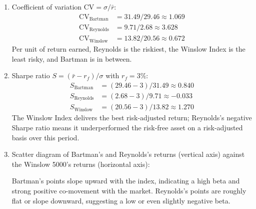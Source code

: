 \documentclass[11pt]{article}
\begin{document}
\begin{enumerate}
  \item[c.] Coefficient of variation $\text{CV} = \sigma/\bar{r}$:
    \begin{align*}
      \text{CV}_{\text{Bartman}}  &= 31.49/29.46 \approx 1.069\\
      \text{CV}_{\text{Reynolds}} &= 9.71/2.68  \approx 3.628\\
      \text{CV}_{\text{Winslow}}  &= 13.82/20.56 \approx 0.672
    \end{align*}
    Per unit of return earned, Reynolds is the riskiest, the Winslow Index is the least risky, and Bartman is in between.

  \item[d.] Sharpe ratio $S = (\bar{r}-r_f)/\sigma$ with $r_f = 3\%$:
    \begin{align*}
      S_{\text{Bartman}}  &= (29.46-3)/31.49 \approx 0.840\\
      S_{\text{Reynolds}} &= (2.68-3)/9.71  \approx -0.033\\
      S_{\text{Winslow}}  &= (20.56-3)/13.82 \approx 1.270
    \end{align*}
    The Winslow Index delivers the best risk-adjusted return; Reynolds's negative Sharpe ratio means it underperformed the risk-free asset on a risk-adjusted basis over this period.

  \item[e.] Scatter diagram of Bartman's and Reynolds's returns (vertical axis) against the Winslow 5000's returns (horizontal axis):

    \begin{center}
    \end{center}

    Bartman's points slope upward with the index, indicating a high beta and strong positive co-movement with the market. Reynolds's points are roughly flat or slope downward, suggesting a low or even slightly negative beta.
\end{enumerate}
\end{document}
